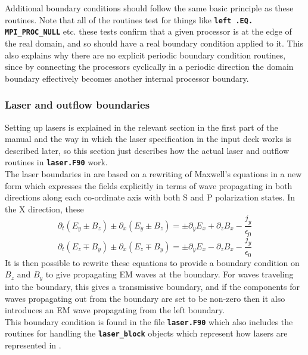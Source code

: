 \documentclass[12pt,a4paper]{article}
\newcommand{\inlinecode}[1]{{\color{warwickred} \bf\texttt{#1}}}
\newcommand{\EPOCH}{{\color{warwickdark}\fontfamily{phv}\selectfont{EPOCH}}}
\begin{document}
Additional boundary conditions should follow the same basic principle as these
routines. Note that all of the routines test for things like \inlinecode{left
.EQ. MPI\_PROC\_NULL} etc. these tests confirm that a given processor is at the
edge of the real domain, and so should have a real boundary condition applied
to it. This also explains why there are no explicit periodic boundary condition
routines, since by connecting the processors cyclically in a periodic direction
the domain boundary effectively becomes another internal processor boundary.

\subsubsection{Laser and outflow boundaries}
Setting up lasers is explained in the relevant section in the first part of the
manual and the way in which the laser specification in the input deck works is
described later, so this section just describes how the actual laser and
outflow routines in \inlinecode{laser.F90} work. \\

The laser boundaries in {\EPOCH} are based on a rewriting of Maxwell's equations
in a new form which expresses the fields explicitly in terms of wave
propagating in both directions along each co-ordinate axis with both S and P
polarization states. In the X direction, these
\[
\partial_t(E_y \pm B_z) \pm \partial_x(E_y \pm B_z) = \pm \partial_yE_x
+ \partial_zB_x -\frac{j_y}{\epsilon_0}
\]
\[
\partial_t(E_z \mp B_y) \pm \partial_x(E_z \mp B_y) = \pm \partial_yE_x
- \partial_zB_x -\frac{j_y}{\epsilon_0}
\]
It is then possible to rewrite these equations to provide a boundary condition
on $B_z$ and $B_y$ to give propagating EM waves at the boundary. For waves
traveling into the boundary, this gives a transmissive boundary, and if the
components for waves propagating out from the boundary are set to be non-zero
then it also introduces an EM wave propagating from the left boundary.\\

This boundary condition is found in the file \inlinecode{laser.F90} which also
includes the routines for handling the \inlinecode{laser\_block} objects which
represent how lasers are represented in \EPOCH.
\end{document}
